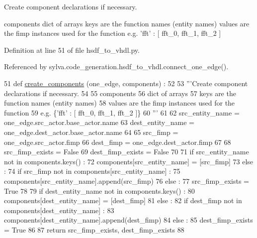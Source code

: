 \begin{DoxyVerb}Create component declarations if necessary.

  components
    dict of arrays
    keys are the function names (entity names)
    values are the fimp instances used for the function
    e.g. {'fft' : [ fft_0, fft_1, fft_2 ]}
\end{DoxyVerb}
 

Definition at line 51 of file hsdf\+\_\+to\+\_\+vhdl.\+py.



Referenced by sylva.\+code\+\_\+generation.\+hsdf\+\_\+to\+\_\+vhdl.\+connect\+\_\+one\+\_\+edge().


\begin{DoxyCode}
51 \textcolor{keyword}{def }\hyperlink{namespacesylva_1_1code__generation_1_1hsdf__to__vhdl_a3672bd3c4fb6d5c86df2d4cd1f64e875}{create\_components} (one\_edge, components) :
52 
53   \textcolor{stringliteral}{'''Create component declarations if necessary.}
54 \textcolor{stringliteral}{}
55 \textcolor{stringliteral}{    components}
56 \textcolor{stringliteral}{      dict of arrays}
57 \textcolor{stringliteral}{      keys are the function names (entity names)}
58 \textcolor{stringliteral}{      values are the fimp instances used for the function}
59 \textcolor{stringliteral}{      e.g. \{'fft' : [ fft\_0, fft\_1, fft\_2 ]\}}
60 \textcolor{stringliteral}{  '''}
61 
62   src\_entity\_name = one\_edge.src\_actor.base\_actor.name
63   dest\_entity\_name = one\_edge.dest\_actor.base\_actor.name
64 
65   src\_fimp = one\_edge.src\_actor.fimp
66   dest\_fimp = one\_edge.dest\_actor.fimp
67 
68   src\_fimp\_exists = \textcolor{keyword}{False}
69   dest\_fimp\_exists = \textcolor{keyword}{False}
70 
71   \textcolor{keywordflow}{if} src\_entity\_name \textcolor{keywordflow}{not} \textcolor{keywordflow}{in} components.keys() :
72     components[src\_entity\_name] = [src\_fimp]
73   \textcolor{keywordflow}{else} :
74     \textcolor{keywordflow}{if} src\_fimp \textcolor{keywordflow}{not} \textcolor{keywordflow}{in} components[src\_entity\_name] :
75       components[src\_entity\_name].append(src\_fimp)
76     \textcolor{keywordflow}{else} :
77       src\_fimp\_exists = \textcolor{keyword}{True}
78 
79   \textcolor{keywordflow}{if} dest\_entity\_name \textcolor{keywordflow}{not} \textcolor{keywordflow}{in} components.keys() :
80     components[dest\_entity\_name] = [dest\_fimp]
81   \textcolor{keywordflow}{else} :
82     \textcolor{keywordflow}{if} dest\_fimp \textcolor{keywordflow}{not} \textcolor{keywordflow}{in} components[dest\_entity\_name] :
83       components[dest\_entity\_name].append(dest\_fimp)
84     \textcolor{keywordflow}{else} :
85       dest\_fimp\_exists = \textcolor{keyword}{True}
86 
87   \textcolor{keywordflow}{return} src\_fimp\_exists, dest\_fimp\_exists
88 
\end{DoxyCode}
